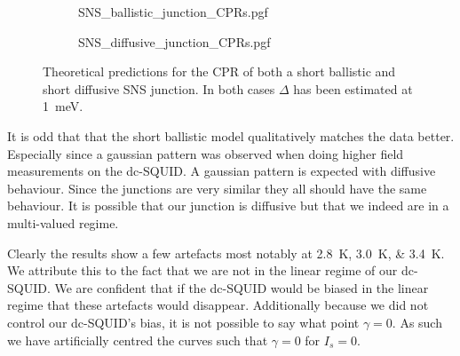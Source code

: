 \begin{figure}[ht!]
	\begin{subfigure}[t]{\textwidth}
		\centering
		{SNS_ballistic_junction_CPRs.pgf}
	\end{subfigure}
	\hfill
	\begin{subfigure}[t]{\textwidth}
		\centering
		{SNS_diffusive_junction_CPRs.pgf}
	\end{subfigure}

	\caption{Theoretical predictions for the CPR of both a short ballistic and short diffusive SNS junction. In both cases $\Delta$ has been estimated at \qty{1}{\milli\electronvolt}.}
	\label{fig:SNS_junction_predictions}
\end{figure}

It is odd that that the short ballistic model qualitatively matches the data better. Especially since a gaussian pattern was observed when doing higher field measurements on the dc-SQUID. A gaussian pattern is expected with diffusive behaviour. Since the junctions are very similar they all should have the same behaviour. It is possible that our junction is diffusive but that we indeed are in a multi-valued regime.

Clearly the results show a few artefacts most notably at \qtylist{2.8;3.0;3.4}{\kelvin}. We attribute this to the fact that we are not in the linear regime of our dc-SQUID. We are confident that if the dc-SQUID would be biased in the linear regime that these artefacts would disappear. Additionally because we did not control our dc-SQUID's bias, it is not possible to say what point $\gamma = 0$. As such we have artificially centred the curves such that $\gamma = 0$ for $I_s=0$.